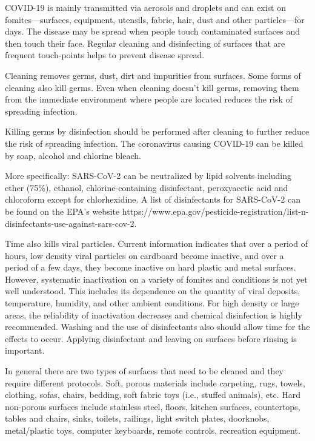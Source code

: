 \documentclass[onecolumn,journal]{IEEEtran}
\begin{document}
\begin{multicols}{2}
COVID-19 is mainly transmitted via aerosols and droplets and can exist on fomites---surfaces, equipment, utensils, fabric, hair, dust and other particles---for days. The disease may be spread when people touch contaminated surfaces and then touch their face. Regular cleaning and disinfecting of surfaces that are frequent touch-points helps to prevent disease spread.

Cleaning removes germs, dust, dirt and impurities from surfaces. Some forms of cleaning also kill germs. Even when cleaning doesn't kill germs, removing them from the immediate environment where people are located reduces the risk of spreading infection. 

Killing germs by disinfection should be performed after cleaning to further reduce the risk of spreading infection. The coronavirus causing COVID-19 can be killed by soap, alcohol and chlorine bleach. 

More specifically: SARS-CoV-2 can be neutralized by lipid solvents including ether (75\%), ethanol, chlorine-containing disinfectant, peroxyacetic acid and chloroform except for chlorhexidine. A list of disinfectants for SARS-CoV-2 can be found on the EPA's website https://www.epa.gov/pesticide-registration/list-n-disinfectants-use-against-sars-cov-2.

Time also kills viral particles. Current information indicates that  over a period of hours, low density viral particles on cardboard become inactive, and over a period of a few days, they become inactive on hard plastic and metal surfaces. However, systematic inactivation on a variety of fomites and conditions is not yet well understood. This includes its dependence on the quantity of viral deposits, temperature, humidity, and other ambient conditions. For high density or large areas, the reliability of inactivation decreases and chemical disinfection is highly recommended. Washing and the use of disinfectants also should allow time for the effects to occur. Applying disinfectant and leaving on surfaces before rinsing is important. 

In general there are two types of surfaces that need to be cleaned and they require different protocols. Soft, porous materials include carpeting, rugs, towels, clothing, sofas, chairs, bedding, soft fabric toys (i.e., stuffed animals), etc. Hard non-porous surfaces include stainless steel, floors, kitchen surfaces, countertops, tables and chairs, sinks, toilets, railings, light switch plates, doorknobs, metal/plastic toys, computer keyboards, remote controls, recreation equipment.


\end{multicols}
\end{document}
